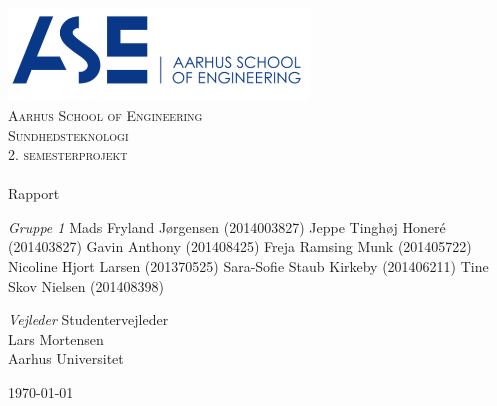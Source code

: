\begin{titlingpage}
\begin{center}

~ \\[3cm]

\includegraphics[width=0.6\textwidth]{figurer/ASE}~\\[1cm]

\textsc{\LARGE Aarhus School of Engineering}\\[1.5cm]

\textsc{\Large Sundhedsteknologi}\\
\textsc{\Large 2. semesterprojekt}\\[0.5cm]

\noindent\makebox[\linewidth]{\rule{\textwidth}{0.4pt}}\\
[0.5cm]{\Huge Rapport}
\noindent\makebox[\linewidth]{\rule{\textwidth}{0.4pt}}

\end{center}

\textit{Gruppe 1} \newline
Mads Fryland J\o rgensen (2014003827) \newline
Jeppe Tingh\o j Honeré (201403827) \newline
Gavin Anthony (201408425) \newline
Freja Ramsing Munk (201405722) \newline		 
Nicoline Hjort Larsen (201370525) \newline 
Sara-Sofie Staub Kirkeby (201406211) \newline
Tine Skov Nielsen (201408398) \newline


\textit{Vejleder} \newline
Studentervejleder\\
Lars Mortensen\\
Aarhus Universitet


\vfill

\begin{center}
{\large \today}
\end{center}


\end{titlingpage}